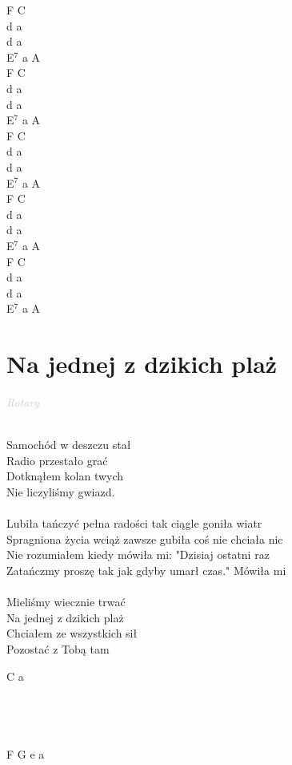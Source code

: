 \documentclass[a5paper, 10pt]{book}
\begin{document}
\begin{minipage}[t]{0.3\textwidth}
F C\\
d a\\
d a\\
E$^7$ a A\\

F C\\
d a\\
d a\\
E$^7$ a A\\

F C\\
d a\\
d a\\
E$^7$ a A\\

F C\\
d a\\
d a\\
E$^7$ a A\\

F C\\
d a\\
d a\\
E$^7$ a A\\
\end{minipage}

\newpage
\section{Na jednej z dzikich plaż}\textcolor{lightgray}{\textit{Rotary}}\\~\\
\begin{minipage}[t]{0.8\textwidth}
Samochód w deszczu stał\\
Radio przestało grać\\
Dotknąłem kolan twych\\
Nie liczyliśmy gwiazd.\\
\\
\hspace*{5mm}Lubiła tańczyć pełna radości tak ciągle goniła wiatr\\
\hspace*{5mm}Spragniona życia wciąż zawsze gubiła coś nie chciała nic\\
\hspace*{5mm}Nie rozumiałem kiedy mówiła mi: "Dzisiaj ostatni raz\\
\hspace*{5mm}Zatańczmy proszę tak jak gdyby umarł czas." Mówiła mi\\
\\
Mieliśmy wiecznie trwać\\
Na jednej z dzikich plaż\\
Chciałem ze wszystkich sił\\
Pozostać z Tobą tam\\
\end{minipage}
\begin{minipage}[t]{0.2\textwidth}
C a\\
~\\
~\\
~\\
~\\
F G e a\\
\end{minipage}
\end{document}
